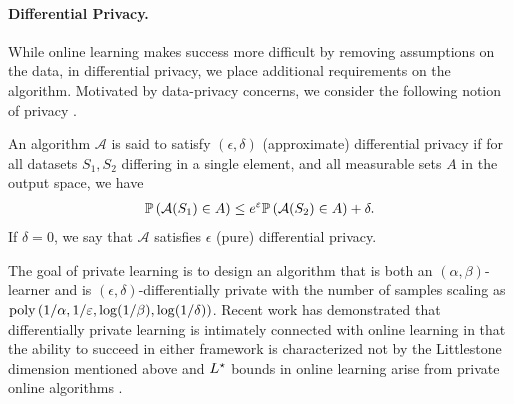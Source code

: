 \paragraph{Differential Privacy.}  While online learning makes success more difficult by removing assumptions on the data, in differential privacy, we place additional requirements on the algorithm.  
Motivated by data-privacy concerns, we consider the following notion of privacy \citep{DworkMNS06}. 
\begin{definition}
    An algorithm $\mathcal{A}$ is said to satisfy $(\epsilon, \delta)$ (approximate) differential privacy  if for all datasets $S_1, S_2$ differing in a single element, and all measurable sets $A$ in the output space, we have
    \begin{align}
        \mathbb{P}\left(\mathcal{A}(S_1) \in A\right) \leq e^\varepsilon \mathbb{P}\left(\mathcal{A}(S_2) \in A\right) + \delta.
    \end{align}
    If $\delta = 0$, we say that $\mathcal{A}$ satisfies $\epsilon$ (pure) differential privacy.
\end{definition}
The goal of private learning is to design an algorithm that is both an $(\alpha, \beta)$-learner and is $(\epsilon, \delta)$-differentially private with the number of samples scaling as $\mathrm{poly}\left( 1/\alpha, 1/\varepsilon, \log(1/\beta), \log(1/\delta) \right)$. 
Recent work has demonstrated that differentially private learning is intimately connected with online learning in that the ability to succeed in either framework is characterized not by the Littlestone dimension mentioned above \citep{AlonLMM19} and $L^\star$ bounds in online learning arise from private online algorithms \citep{hutter2004prediction,abernethy2019online,wang2022adaptive}.

